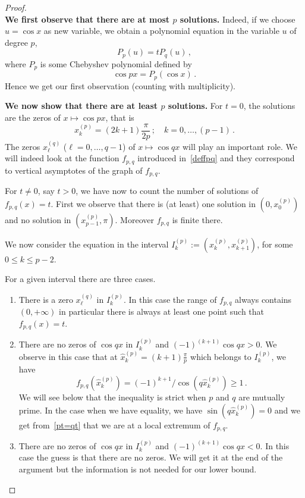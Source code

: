 \documentclass[a4paper,reqno,11pt]{amsart}
\theoremstyle{remark}
\theoremstyle{definition}
\numberwithin{equation}{section}
\begin{document}
\begin{proof}~\\
{\bf We first observe that there are at most $p$ solutions.} Indeed, if we choose $u=\cos x$ as new 
variable, we obtain a polynomial equation in the variable $u$ of degree $p$,  
\[
P_p (u) = t P_q (u)\,,
\]
where $P_p$ is some  Chebyshev  polynomial defined by
\[
\cos px  = P_p (\cos x)\,.
\]
Hence we get our first observation (counting with multiplicity).

{\bf We now show that there are at least $p$ solutions.} For $t=0$, the solutions are 
the zeros of $x\mapsto \cos px$, that is 
\[
x_k^{(p)}= (2k+1) \frac{\pi} {2p}\,; \quad k=0,\dots, (p-1)\,.
\]
The zeros $x_\ell^{(q)}$ ($\ell=0,\dots, q-1$) of $x\mapsto \cos qx$ will 
play an important role. We will indeed look at the function $f_{p,q}$ introduced 
in~\eqref{deffpq} and they correspond to vertical asymptotes of the graph of 
$f_{p,q}$.

For $t\neq 0$, say $t >0$, we have now to count the number of solutions of 
$f_{p,q}(x)=t$. First we observe that there is (at least) one solution in
$(0,x_0^{(p)})$ and no solution in $(x_{p-1}^{(p)},\pi)$. Moreover $f_{p,q}$ 
is finite there.

We now consider the equation in the interval 
$I_k^{(p)}:=(x_k^{(p)},  x_{k+1}^{(p)})$, for some  $0\leq k \leq p-2$.

For a given interval there are three cases.
\begin{enumerate}
\item 
There is a zero $x_\ell^{(q)}$ in  $I_k^{(p)}$. In this case the range 
of $f_{p,q}$ always contains $(0,+\infty)$ in particular there is always 
at least one point such that $f_{p,q} (x) =t$.
\item 
There are no zeros of $\cos qx$ in $I_k^{(p)}$ and 
$(-1) ^{(k+1)} \cos q x >0$. We observe in this case that at 
$\hat x_k^{(p)}=(k+1) \frac \pi p$ which belongs to $I_k^{(p)}$, we have 
\begin{equation}\label{geq1}
f_{p,q} (\hat x_k^{(p)})= (-1)^{k+1} /\cos (q \hat x_k^{(p)}) \geq 1\,.
\end{equation}
We will 
see below that the inequality is strict when $p$ and $q$ are mutually prime. 
In the case when we have equality, we have $\sin (q \hat x_k^{(p)}) =0$ and 
we get from~\eqref{pt=qt} that we are at a local extremum of $f_{p,q}$.

\item 
There are no zeros of $\cos qx$ in $I_k^{(p)}$ and 
$(-1) ^{(k+1)} \cos q x < 0$.  In this case the guess is that there are 
no zeros. We will get it at the end of the argument but the information is 
not needed for our lower bound.
\end{enumerate}


\end{proof}
\end{document}
